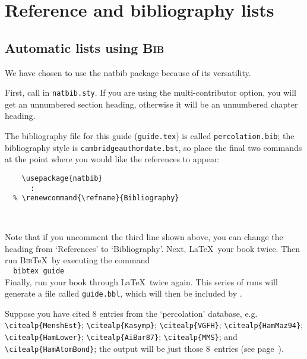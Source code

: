 
\chapter{Reference and bibliography lists}

\section{Automatic lists using \textsc{Bib}\upshape{\TeX}}

We have chosen to use the natbib package because of its versatility.

First, call in \verb"natbib.sty". If you are using the multi-contributor option, you will get an unnumbered section heading, otherwise it will be an unnumbered chapter heading.

The bibliography file for this guide ({\verbatimsize\texttt{\cambridge guide.tex}}) is called \verb"percolation.bib"; the bibliography style is \verb"cambridgeauthordate.bst", so place the final two commands at the point where you would like the references to appear:
%
\begin{verbatim}
    \usepackage{natbib}
      :
  % \renewcommand{\refname}{Bibliography}
    
    
\end{verbatim}
%
Note that if you uncomment the third line shown above, you can change the heading from `References' to `Bibliography'. Next, \LaTeX\ your book twice. Then run \textsc{Bib}\TeX\ by executing the command\\[0.5\baselineskip]
\verb"  bibtex "{\verbatimsize\texttt{\cambridge guide}}\\[0.5\baselineskip]
Finally, run your book through \LaTeX\ twice again. This series of runs will generate a file called {\verbatimsize\texttt{\cambridge guide.bbl}}, which will then be included by \verb"".

Suppose you have cited 8 entries from the `percolation' database, e.g. \verb"\citealp{MenshEst}"; \verb"\citealp{Kasymp}"; \verb"\citealp{VGFH}"; \verb"\citealp{HamMaz94}"; \verb"\citealp{HamLower}"; \verb"\citealp{AiBar87}"; \verb"\citealp{MMS}"; and \verb"\citealp{HamAtomBond}"; the output will be just those 8~entries (see page~\pageref{refs}).%
\nocite{MenshEst}\nocite{Kasymp}\nocite{VGFH}\nocite{HamMaz94}\nocite{HamLower}\nocite{AiBar87}\nocite{MMS}\nocite{HamAtomBond}

